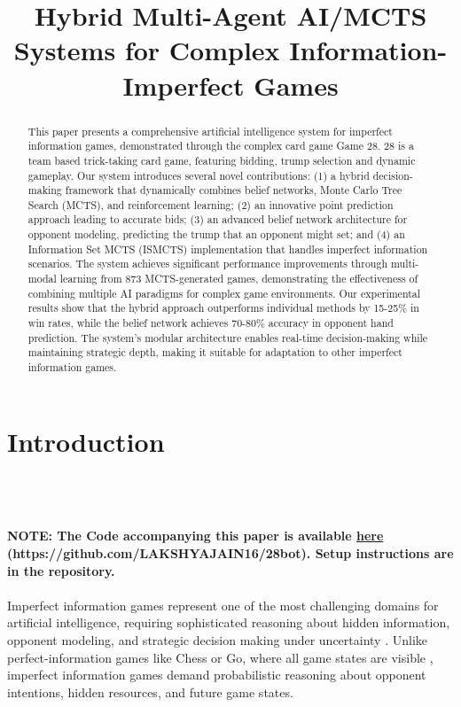 \documentclass[conference]{IEEEtran}
\begin{document}
\title{Hybrid Multi-Agent AI/MCTS Systems for Complex Information-Imperfect Games }

\author{
\and
{}
}
\maketitle

\begin{abstract}
This paper presents a comprehensive artificial intelligence system for imperfect information games, demonstrated through the complex card game Game 28. 28 is a team based trick-taking card game, featuring bidding, trump selection and dynamic gameplay. Our system introduces several novel contributions: (1) a hybrid decision-making framework that dynamically combines belief networks, Monte Carlo Tree Search (MCTS), and reinforcement learning; (2) an innovative point prediction approach leading to accurate bids; (3) an advanced belief network architecture for opponent modeling, predicting the trump that an opponent might set; and (4) an Information Set MCTS (ISMCTS) implementation that handles imperfect information scenarios. The system achieves significant performance improvements through multi-modal learning from 873 MCTS-generated games, demonstrating the effectiveness of combining multiple AI paradigms for complex game environments. Our experimental results show that the hybrid approach outperforms individual methods by 15-25\% in win rates, while the belief network achieves 70-80\% accuracy in opponent hand prediction. The system's modular architecture enables real-time decision-making while maintaining strategic depth, making it suitable for adaptation to other imperfect information games.
\end{abstract}


\section{Introduction}
\\ \\ \\
\textbf{NOTE: The Code accompanying this paper is available  \href{https://github.com/LAKSHYAJAIN16/28bot}{here} (https://github.com/LAKSHYAJAIN16/28bot). Setup instructions are in the repository.}
\\
\\
Imperfect information games represent one of the most challenging domains for artificial intelligence, requiring sophisticated reasoning about hidden information, opponent modeling, and strategic decision making under uncertainty \cite{heinrich2015fictitious,lanctot2017unified}. Unlike perfect-information games like Chess or Go, where all game states are visible \cite{silver2016mastering,schrittwieser2020mastering}, imperfect information games demand probabilistic reasoning about opponent intentions, hidden resources, and future game states.
\end{document}
